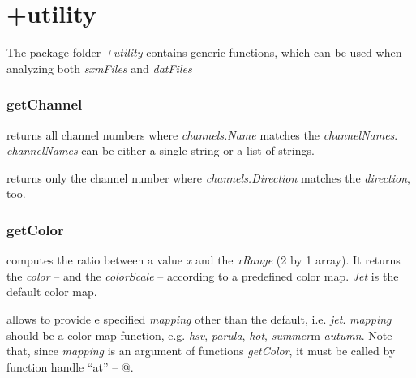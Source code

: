 \newpage
\tableofcontents





\section{+utility}

The package folder \emph{+utility} contains generic functions, which can be used when analyzing both \emph{sxmFiles} and \emph{datFiles}
\subsubsection{getChannel}
\bdf
{} returns all channel numbers where \emph{channels.Name} matches the \emph{channelNames}. \emph{channelNames} can be either a single string or a list of strings.

 returns only the channel number where \emph{channels.Direction} matches the \emph{direction}, too.
\edf
\subsubsection{getColor}
\bdf
{} computes the ratio between a value \emph{x} and the \emph{xRange} (2 by 1 array). It returns the \emph{color} --  and the \emph{colorScale}  -- according to a predefined color map. \emph{Jet} is the default color map. 

 allows to provide e specified \emph{mapping} other than the default, i.e. \emph{jet}. \emph{mapping} should be a color map function, e.g. \emph{hsv}, \emph{parula}, \emph{hot}, \emph{summer}m \emph{autumn}. Note that, since \emph{mapping} is an argument of functions \emph{getColor}, it must be called by function handle ``at'' -- @.
\edf

\newpage

